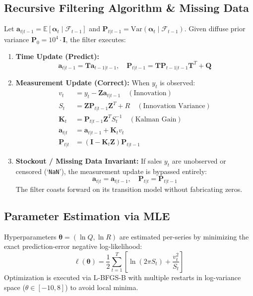 \documentclass[conference]{IEEEtran}
\begin{document}
\subsection{Recursive Filtering Algorithm \& Missing Data}
Let $\mathbf{a}_{t|t-1} = \mathbb{E}[\boldsymbol{\alpha}_t \mid \mathcal{F}_{t-1}]$ and $\mathbf{P}_{t|t-1} = \text{Var}(\boldsymbol{\alpha}_t \mid \mathcal{F}_{t-1})$. Given diffuse prior variance $\mathbf{P}_0 = 10^4 \cdot \mathbf{I}$, the filter executes:
\begin{enumerate}
    \item \textbf{Time Update (Predict):}
    \begin{equation}
    \mathbf{a}_{t|t-1} = \mathbf{T} \mathbf{a}_{t-1|t-1}, \quad \mathbf{P}_{t|t-1} = \mathbf{T} \mathbf{P}_{t-1|t-1} \mathbf{T}^T + \mathbf{Q}
    \end{equation}
    \item \textbf{Measurement Update (Correct):}
    When $y_t$ is observed:
    \begin{align}
    v_t &= y_t - \mathbf{Z} \mathbf{a}_{t|t-1} \quad (\text{Innovation}) \\
    S_t &= \mathbf{Z} \mathbf{P}_{t|t-1} \mathbf{Z}^T + R \quad (\text{Innovation Variance}) \\
    \mathbf{K}_t &= \mathbf{P}_{t|t-1} \mathbf{Z}^T S_t^{-1} \quad (\text{Kalman Gain}) \\
    \mathbf{a}_{t|t} &= \mathbf{a}_{t|t-1} + \mathbf{K}_t v_t \\
    \mathbf{P}_{t|t} &= (\mathbf{I} - \mathbf{K}_t \mathbf{Z}) \mathbf{P}_{t|t-1}
    \end{align}
    \item \textbf{Stockout / Missing Data Invariant:}
    If sales $y_t$ are unobserved or censored (`\texttt{NaN}'), the measurement update is bypassed entirely:
    \begin{equation}
    \mathbf{a}_{t|t} = \mathbf{a}_{t|t-1}, \quad \mathbf{P}_{t|t} = \mathbf{P}_{t|t-1}
    \end{equation}
    The filter coasts forward on its transition model without fabricating zeros.
\end{enumerate}

\subsection{Parameter Estimation via MLE}
Hyperparameters $\boldsymbol{\theta} = (\ln Q, \ln R)$ are estimated per-series by minimizing the exact prediction-error negative log-likelihood:
\begin{equation}
\ell(\boldsymbol{\theta}) = \frac{1}{2}\sum_{t=1}^T \left[ \ln(2\pi S_t) + \frac{v_t^2}{S_t} \right]
\end{equation}
Optimization is executed via L-BFGS-B with multiple restarts in log-variance space ($\theta \in [-10, 8]$) to avoid local minima.
\end{document}

